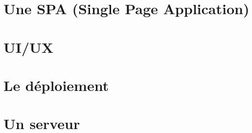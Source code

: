\section{Une SPA (Single Page Application)}\label{sec:spa}


\section{UI/UX}\label{sec:ui-ux}



\section{Le déploiement}\label{sec:deploiement}


\section{Un serveur}\label{sec:serveur}
